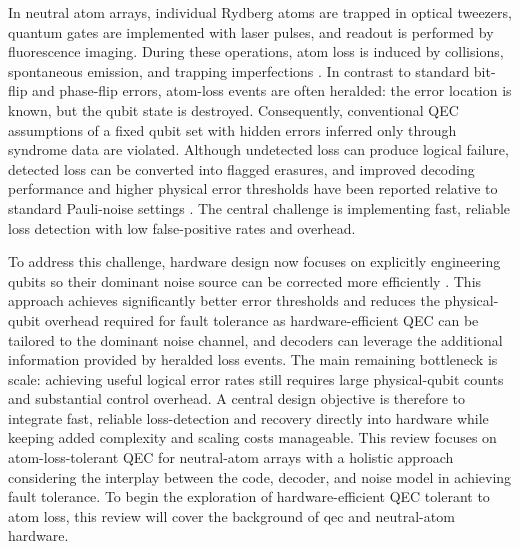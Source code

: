 \documentclass{article}
\begin{document}
In neutral atom arrays, individual Rydberg atoms are trapped in optical tweezers, quantum gates are implemented with laser pulses, and readout is performed by fluorescence imaging.
During these operations, atom loss is induced by collisions, spontaneous emission, and trapping imperfections \cite{bluvstein2024logical}.
In contrast to standard bit-flip and phase-flip errors, atom-loss events are often heralded: the error location is known, but the qubit state is destroyed.
Consequently, conventional QEC assumptions of a fixed qubit set with hidden errors inferred only through syndrome data are violated.
Although undetected loss can produce logical failure, detected loss can be converted into flagged erasures, and improved decoding performance and higher physical error thresholds have been reported relative to standard Pauli-noise settings \cite{gu2024optimizing, chang2024surface, gu2023fault}.
The central challenge is implementing fast, reliable loss detection with low false-positive rates and overhead.

To address this challenge, hardware design now focuses on explicitly engineering qubits so their dominant noise source can be corrected more efficiently \cite{wu2022erasure, kubica2023erasure, teoh2023dual, scholl2023erasure, kang2023quantum, koottandavida2024erasure, gu2023fault, levine2024demonstrating, hann2024hybrid, guillaud2021error, guillaud2019repetition, xu2023autonomous}.
This approach achieves significantly better error thresholds and reduces the physical-qubit overhead required for fault tolerance as hardware-efficient QEC can be tailored to the dominant noise channel, and decoders can leverage the additional information provided by heralded loss events.
The main remaining bottleneck is scale: achieving useful logical error rates still requires large physical-qubit counts and substantial control overhead. 
A central design objective is therefore to integrate fast, reliable loss-detection and recovery directly into hardware while keeping added complexity and scaling costs manageable.
This review focuses on atom-loss-tolerant QEC for neutral-atom arrays with a holistic approach considering the interplay between the code, decoder, and noise model in achieving fault tolerance. 
To begin the exploration of hardware-efficient QEC tolerant to atom loss, this review will cover the background of qec and neutral-atom hardware.
\end{document}
